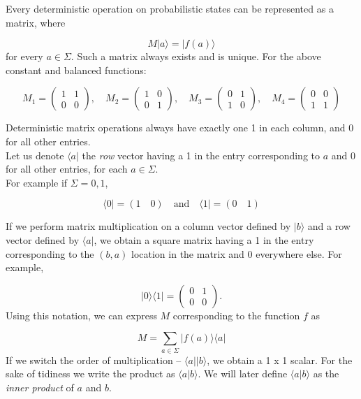 \documentclass[svgnames]{article}     %
\begin{document}
Every deterministic operation on probabilistic states can be represented as a matrix, where

\[
M |a\rangle = |f(a)\rangle 
\] \vspace{5px}
for every $a \in \Sigma$. Such a matrix always exists and is unique. For the above constant and balanced functions: 

\[
M_1 = \begin{pmatrix}
  1 & 1 \\ 0 & 0
\end{pmatrix}, \quad M_2 = \begin{pmatrix}
  1 & 0 \\ 0 & 1
\end{pmatrix}, \quad M_3 = \begin{pmatrix}
  0 & 1 \\ 1 & 0
\end{pmatrix}, \quad M_4 = \begin{pmatrix}
  0 & 0 \\ 1 & 1
\end{pmatrix} \] \vspace{5px}

Deterministic matrix operations always have exactly one 1 in each column, and 0 for all other entries. \\

Let us denote $\langle a |$ the \textit{row} vector having a 1 in the entry corresponding to $a$ and 0 for all other entries, for each $a \in \Sigma$. \\

For example if $\Sigma = {0, 1}$, 

\[
  \langle 0 | = ( 1 \quad 0 ) \quad \text{and} \quad \langle 1 | = (0 \quad 1) \] \vspace{5px}

If we perform matrix multiplication on a column vector defined by $|b\rangle$ and a row vector defined by $\langle a |$, we obtain a square matrix having a 1 in the entry corresponding to the $(b, a)$ location in the matrix and 0 everywhere else. For example, 

\[
  |0\rangle\langle 1 | = \begin{pmatrix}
    0 & 1 \\ 0 & 0
\end{pmatrix}.  \] \vspace{5px}
Using this notation, we can express $M$ corresponding to the function $f$ as 

\[
  M = \sum_{a \in \Sigma} | f(a)\rangle\langle a |
\] \vspace{5px}
If we switch the order of multiplication -- $\langle a || b\rangle$, we obtain a 1 x 1 scalar. For the sake of tidiness we write the product as $\langle a | b \rangle$. We will later define $\langle a | b \rangle$ as the \textit{inner product} of $a $ and $b$.  
\end{document}
